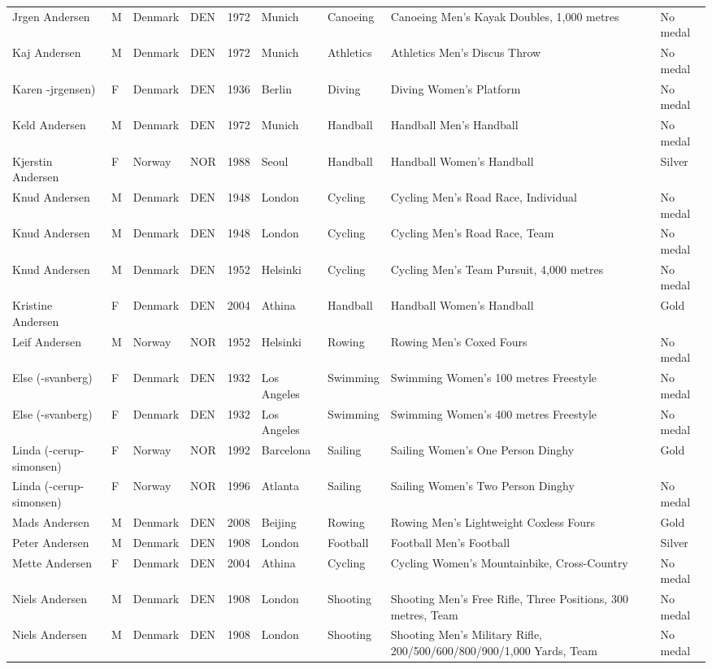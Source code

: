 \documentclass{article}%
\begin{document}
\begin{longtable}{l l l l l l l l l}
Jrgen Andersen&M&Denmark&DEN&1972&Munich&Canoeing&Canoeing Men's Kayak Doubles, 1,000 metres&No medal\\%
Kaj Andersen&M&Denmark&DEN&1972&Munich&Athletics&Athletics Men's Discus Throw&No medal\\%
Karen {-}jrgensen)&F&Denmark&DEN&1936&Berlin&Diving&Diving Women's Platform&No medal\\%
Keld Andersen&M&Denmark&DEN&1972&Munich&Handball&Handball Men's Handball&No medal\\%
Kjerstin Andersen&F&Norway&NOR&1988&Seoul&Handball&Handball Women's Handball&Silver\\%
Knud Andersen&M&Denmark&DEN&1948&London&Cycling&Cycling Men's Road Race, Individual&No medal\\%
Knud Andersen&M&Denmark&DEN&1948&London&Cycling&Cycling Men's Road Race, Team&No medal\\%
Knud Andersen&M&Denmark&DEN&1952&Helsinki&Cycling&Cycling Men's Team Pursuit, 4,000 metres&No medal\\%
Kristine Andersen&F&Denmark&DEN&2004&Athina&Handball&Handball Women's Handball&Gold\\%
Leif Andersen&M&Norway&NOR&1952&Helsinki&Rowing&Rowing Men's Coxed Fours&No medal\\%
Else ({-}svanberg)&F&Denmark&DEN&1932&Los Angeles&Swimming&Swimming Women's 100 metres Freestyle&No medal\\%
Else ({-}svanberg)&F&Denmark&DEN&1932&Los Angeles&Swimming&Swimming Women's 400 metres Freestyle&No medal\\%
Linda ({-}cerup{-}simonsen)&F&Norway&NOR&1992&Barcelona&Sailing&Sailing Women's One Person Dinghy&Gold\\%
Linda ({-}cerup{-}simonsen)&F&Norway&NOR&1996&Atlanta&Sailing&Sailing Women's Two Person Dinghy&No medal\\%
Mads Andersen&M&Denmark&DEN&2008&Beijing&Rowing&Rowing Men's Lightweight Coxless Fours&Gold\\%
Peter Andersen&M&Denmark&DEN&1908&London&Football&Football Men's Football&Silver\\%
Mette Andersen&F&Denmark&DEN&2004&Athina&Cycling&Cycling Women's Mountainbike, Cross{-}Country&No medal\\%
Niels Andersen&M&Denmark&DEN&1908&London&Shooting&Shooting Men's Free Rifle, Three Positions, 300 metres, Team&No medal\\%
Niels Andersen&M&Denmark&DEN&1908&London&Shooting&Shooting Men's Military Rifle, 200/500/600/800/900/1,000 Yards, Team&No medal\\%

\end{longtable}
\end{document}

